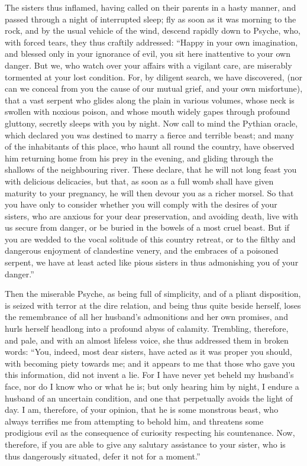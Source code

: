 \documentclass[12pt]{article}
\begin{document}
The sisters thus inflamed, having called on their parents in a hasty manner,
and passed through a night of interrupted sleep; fly as soon as it was morning
to the rock, and by the usual vehicle of the wind, descend rapidly down to
Psyche, who, with forced tears, they thus craftily addressed: ``Happy in your
own imagination, and blessed only in your ignorance of evil, you sit here
inattentive to your own danger. But we, who watch over your affairs with a
vigilant care, are miserably tormented at your lost condition. For, by diligent
search, we have discovered, (nor can we conceal from you the cause of our
mutual grief, and your own misfortune), that a vast serpent who glides along
the plain in various volumes, whose neck is swollen with noxious poison, and
whose mouth widely gapes through profound gluttony, secretly sleeps with you by
night. Now call to mind the Pythian oracle, which declared you was destined to
marry a fierce and terrible beast; and many of the inhabitants of this place,
who haunt all round the country, have observed him returning home from his prey
in the evening, and gliding through the shallows of the neighbouring river.
These declare, that he will not long feast you with delicious delicacies, but
that, as soon as a full womb shall have given maturity to your pregnancy, he
will then devour you as a richer morsel. So that you have only to consider
whether you will comply with the desires of your sisters, who are anxious for
your dear preservation, and avoiding death, live with us secure from danger, or
be buried in the bowels of a most cruel beast. But if you are wedded to the
vocal solitude of this country retreat, or to the filthy and dangerous
enjoyment of clandestine venery, and the embraces of a poisoned serpent, we
have at least acted like pious sisters in thus admonishing you of your
danger.''

Then the miserable Psyche, as being full of simplicity, and of a pliant
disposition, is seized with terror at the dire relation, and being thus quite
beside herself, loses the remembrance of all her husband's admonitions and her
own promises, and hurls herself headlong into a profound abyss of calamity.
Trembling, therefore, and pale, and with an almost lifeless voice, she thus
addressed them in broken words: ``You, indeed, most dear sisters, have acted as
it was proper you should, with becoming piety towards me; and it appears to me
that those who gave you this information, did not invent a lie. For I have
never yet beheld my husband's face, nor do I know who or what he is; but only
hearing him by night, I endure a husband of an uncertain condition, and one
that perpetually avoids the light of day. I am, therefore, of your opinion,
that he is some monstrous beast, who always terrifies me from attempting to
behold him, and threatens some prodigious evil as the consequence of curiosity
respecting his countenance. Now, therefore, if you are able to give any
salutary assistance to your sister, who is thus dangerously situated, defer it
not for a moment.''
\end{document}
